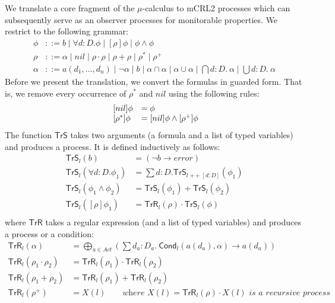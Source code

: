 \documentclass[letter]{llncs}
\newcommand{\Tr}{\ensuremath{\mathsf{TrS}}}
\newcommand{\TrR}{\ensuremath{\mathsf{TrR}}}
\newcommand{\TrA}{\ensuremath{\mathsf{Cond}}}
\newcommand{\concat}{\ensuremath{\mathop{+\!\!+}}}
\begin{document}
We translate a core fragment of the $\mu$-calculus to mCRL2 processes which
can subsequently serve as an observer processes for monitorable properties.
We restrict to the following grammar:
\vspace{-4 pt}
\[
\begin{array}{ll}
\phi & ::= b \mid \forall d{:}D.\phi \mid [\rho]\phi \mid \phi\wedge \phi\\
\rho & ::= \alpha \mid nil \mid \rho\cdot \rho \mid
              \rho+\rho \mid
              \rho^* \mid \rho^+ \\
\alpha & ::=  a(d_1,\dots,d_n) \mid \neg \alpha \mid b \mid
              \alpha \cap \alpha \mid \alpha \cup \alpha \mid
              \bigcap d{:}D.~\alpha \mid \bigcup d{:}D.~\alpha
\end{array}
\]
Before we present the translation, we convert the formulas in
guarded form. That is, we remove every occurrence of $\rho^*$ and $nil$ using
the following rules:
\[
\vspace{-4 pt}
\begin{array}{ll}
~
[nil]\phi &= \phi \\
~[\rho^*]\phi &= [nil]\phi \wedge [\rho^+]\phi
\end{array}
\]
The function $\Tr$ takes two arguments (a formula and a list of typed
variables) and produces a process. It is defined inductively as follows:
\[
\begin{array}{ll}
\Tr_l(b) &= (\neg b \to \textit{error}) \\
\Tr_l(\forall d:D.\phi_1) & = \sum d{:}D. \Tr_{l\concat [d:D]} (\phi_1) \\
\Tr_l(\phi_1 \wedge \phi_2) & = \Tr_l(\phi_1) + \Tr_l(\phi_2) \\
\Tr_l([\rho]\phi_1) & = \TrR_l(\rho) \cdot \Tr_l(\phi) \\
\end{array}
\]
where $\TrR$ takes a regular expression (and a list of typed variables)
and produces a process or a condition:
\[
\begin{array}{ll}
\TrR_l(\alpha) &= \bigoplus\limits_{a \in Act} (\sum d_a{:}D_a.~ \TrA_l(a(d_a),\alpha) \to a(d_a)) \\
\TrR_l(\rho_1 \cdot \rho_2) & = \TrR_l(\rho_1) \cdot \TrR_l(\rho_2) \\
\TrR_l(\rho_1 + \rho_2) &= \TrR_l(\rho_1) + \TrR_l(\rho_2) \\
\TrR_l(\rho^+) & = X(l) \qquad \textit{where $X(l) = \TrR_l(\rho)\cdot X(l)$ is
a recursive process} 
\end{array}
\]
\end{document}

